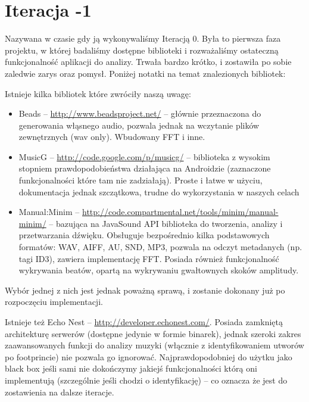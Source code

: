 \section{Iteracja -1}
Nazywana w czasie gdy ją wykonywaliśmy Iteracją 0. Była to pierwsza faza projektu, w której badaliśmy dostępne biblioteki i rozważaliśmy ostateczną funkcjonalność aplikacji do analizy. Trwała bardzo krótko, i zostawiła po sobie zaledwie zarys oraz pomysł. Poniżej notatki na temat znalezionych bibliotek:

\begin{Note}

Istnieje kilka bibliotek które zwróciły naszą uwagę:

\begin{itemize}
  \item Beads -- \url{http://www.beadsproject.net/} -- głównie przeznaczona do generowania włąsnego audio, pozwala jednak na wczytanie plików zewnętrznych (wav only). Wbudowany FFT i inne.
  \item MusicG -- \url{http://code.google.com/p/musicg/} -- biblioteka z wysokim stopniem prawdopodobieństwa działająca na Androidzie (zaznaczone funkcjonalności które tam nie zadziałają). Proste i łatwe w użyciu, dokumentacja jednak szczątkowa, trudne do wykorzystania w naszych celach
  \item Manual:Minim -- \url{http://code.compartmental.net/tools/minim/manual-minim/} -- bazująca na JavaSound API biblioteka do tworzenia, analizy i przetwarzania dźwięku. Obsługuje bezpośrednio kilka podstawowych formatów: WAV, AIFF, AU, SND, MP3, pozwala na odczyt metadanych (np. tagi ID3), zawiera implementację FFT. Posiada również funkcjonalność wykrywania beatów, opartą na wykrywaniu gwałtownych skoków amplitudy.
\end{itemize}

Wybór jednej z nich jest jednak poważną sprawą, i zostanie dokonany już po rozpoczęciu implementacji.

Istnieje też Echo Nest -- \url{http://developer.echonest.com/}. Posiada zamkniętą architekturę
serwerów (dostępne jedynie w formie binarek), jednak szeroki zakres zaawansowanych funkcji do
analizy muzyki (włącznie z identyfikowaniem utworów po footprincie) nie pozwala go ignorować.
Najprawdopodobniej do użytku jako black box jeśli sami nie dokończymy jakiejś funkcjonalności którą
oni implementują (szczególnie jeśli chodzi o identyfikację) -- co oznacza że jest do zostawienia na dalsze iteracje.

\end{Note}

